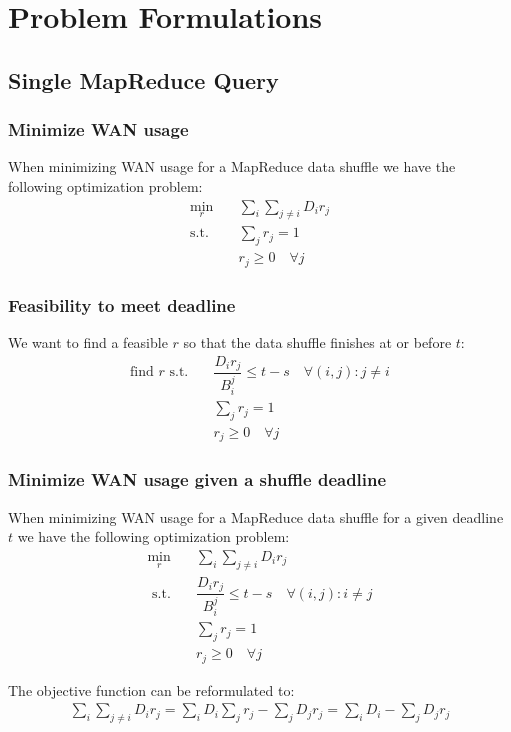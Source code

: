 \section{Problem Formulations}
\label{sec:problem}

\subsection{Single MapReduce Query}

\subsubsection*{Minimize WAN usage}

When minimizing WAN usage for a MapReduce data shuffle we have the following optimization problem:
\begin{subequations}
	\begin{align}
		\min_{r} \quad & \sum_{i}\sum_{j\neq i}D_{i}r_{j} \\
		\text{s.t.} \quad & \sum_{j}r_{j} = 1 \\
		& r_{j} \geq 0 \quad \forall j
	\end{align}
\end{subequations}

\subsubsection*{Feasibility to meet deadline}

We want to find a feasible $r$ so that the data shuffle finishes at or before $t$:
\begin{subequations}
	\begin{align}
		\text{find } r \text{ s.t.} \quad & \dfrac{D_{i}r_{j}}{B_{i}^{j}} \leq t - s \quad \forall (i,j):j\neq i \\
		& \sum_{j}r_{j} = 1 \\
		& r_{j} \geq 0 \quad \forall j
	\end{align}
\end{subequations}

\subsubsection*{Minimize WAN usage given a shuffle deadline}
When minimizing WAN usage for a MapReduce data shuffle for a given deadline $t$ we have the following optimization problem:
\begin{subequations}\label{eq:opt_1Q_MR_WAN_deadline}
	\begin{align}
		\min_{r} \quad & \sum_{i}\sum_{j\neq i}D_{i}r_{j} \\
		\text{ s.t.} \quad & \dfrac{D_{i}r_{j}}{B_{i}^{j}} \leq t - s \quad \forall (i,j):i\neq j \\
		& \sum_{j}r_{j} = 1 \\
		& r_{j} \geq 0 \quad \forall j
	\end{align}
\end{subequations}

The objective function can be reformulated to:
\begin{align}
	\sum_{i}\sum_{j\neq i}D_ir_j = \sum_{i}D_i\sum_{j}r_j - \sum_{j}D_jr_j =\sum_{i}D_i - \sum_{j}D_jr_j
\end{align}